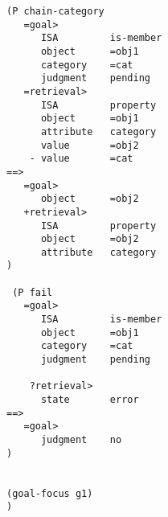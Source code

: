\begin{lstlisting}[caption={ACT-R production rules for the semantic model}]
(P chain-category
   =goal>
      ISA         is-member
      object      =obj1
      category    =cat
      judgment    pending
   =retrieval>
      ISA         property
      object      =obj1
      attribute   category
      value       =obj2
    - value       =cat
==>
   =goal>
      object      =obj2
   +retrieval>  
      ISA         property
      object      =obj2
      attribute   category
)

 (P fail
   =goal>
      ISA         is-member
      object      =obj1
      category    =cat  
      judgment    pending
    
    ?retrieval>
      state       error
==>
   =goal>
      judgment    no
)


(goal-focus g1)
)
\end{lstlisting}
\flushbottom

\raggedbottom
